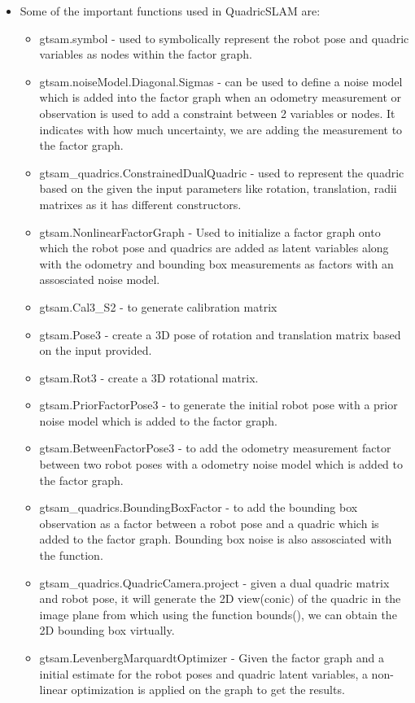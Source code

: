 \documentclass[report.tex]{subfiles}
\begin{document}
\begin{itemize}
\item Some of the important functions used in QuadricSLAM are:
\begin{itemize}
    \item gtsam.symbol - used to symbolically represent the robot pose and quadric variables as nodes within the factor graph.
    \item gtsam.noiseModel.Diagonal.Sigmas - can be used to define a noise model which is added into the factor graph when an odometry measurement or observation is used to add a constraint between 2 variables or nodes. It indicates with how much uncertainty, we are adding the measurement to the factor graph.
    \item gtsam\_quadrics.ConstrainedDualQuadric - used to represent the quadric based on the given the input parameters like rotation, translation, radii matrixes as it has different constructors.
    \item gtsam.NonlinearFactorGraph - Used to initialize a factor graph onto which the robot pose and quadrics are added as latent variables along with the odometry and bounding box measurements as factors with an assosciated noise model.
    \item gtsam.Cal3\_S2 - to generate calibration matrix
    \item gtsam.Pose3 - create a 3D pose of rotation and translation matrix based on the input provided.
    \item gtsam.Rot3 - create a 3D rotational matrix.
    \item gtsam.PriorFactorPose3 - to generate the initial robot pose with a prior noise model which is added to the factor graph.
    \item gtsam.BetweenFactorPose3 - to add the odometry measurement factor between two robot poses with a odometry noise model which is added to the factor graph.
    \item gtsam\_quadrics.BoundingBoxFactor - to add the bounding box observation as a factor between a robot pose and a quadric which is added to the factor graph. Bounding box noise is also assosciated with the function.
    \item gtsam\_quadrics.QuadricCamera.project - given a dual quadric matrix and robot pose, it will generate the 2D view(conic) of the quadric in the image plane from which using the function bounds(), we can obtain the 2D bounding box virtually.
    \item gtsam.LevenbergMarquardtOptimizer - Given the factor graph and a initial estimate for the robot poses and quadric latent variables, a non-linear optimization is applied on the graph to get the results.



\end{itemize}
\end{itemize}
\end{document}
